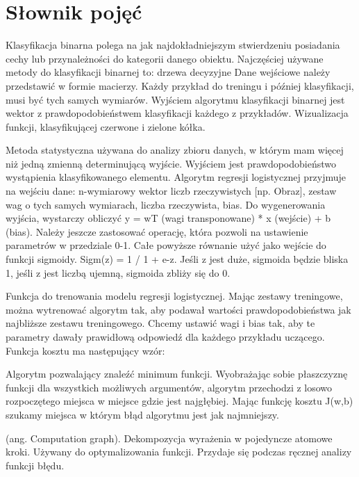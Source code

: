 \documentclass[a4paper,twoside,titlepage,openright]{book}
\begin{document}
\chapter*{Słownik pojęć}
\begin{description}[style=nextline]
	\item[Klasyfikacja binarna] Klasyfikacja binarna polega na jak najdokładniejszym stwierdzeniu posiadania cechy lub przynależności do kategorii danego obiektu.
Najczęściej używane metody do klasyfikacji binarnej to: drzewa decyzyjne 
Dane wejściowe należy przedstawić w formie macierzy. Każdy przykład do treningu i później klasyfikacji, musi być tych samych wymiarów. Wyjściem algorytmu klasyfikacji binarnej jest wektor z prawdopodobieństwem klasyfikacji każdego z przykładów. Wizualizacja funkcji, klasyfikującej czerwone i zielone kółka.
	\item[Regresja logistyczna] Metoda statystyczna używana do analizy zbioru danych, w którym mam więcej niż jedną zmienną determinującą wyjście. Wyjściem jest prawdopodobieństwo wystąpienia klasyfikowanego elementu. Algorytm regresji logistycznej przyjmuje na wejściu dane: n-wymiarowy wektor liczb rzeczywistych [np. Obraz], zestaw wag o tych samych wymiarach, liczba rzeczywista, bias.
Do wygenerowania wyjścia, wystarczy obliczyć y = wT (wagi transponowane) * x (wejście) + b (bias). Należy jeszcze zastosować operację, która pozwoli na ustawienie parametrów w przedziale 0-1. Całe powyższe równanie użyć jako wejście do funkcji sigmoidy. Sigm(z) = 1 / 1 + e-z. Jeśli z jest duże, sigmoida będzie bliska 1, jeśli z jest liczbą ujemną, sigmoida zbliży się do 0.
	\item[Funkcja kosztu] Funkcja do trenowania modelu regresji logistycznej. Mając zestawy treningowe, można wytrenować algorytm tak, aby podawał wartości prawdopodobieństwa jak najbliższe zestawu treningowego. Chcemy ustawić wagi i bias tak, aby te parametry dawały prawidłową odpowiedź dla każdego przykładu uczącego. Funkcja kosztu ma następujący wzór:
	\item[Metoda gradientu prostego] Algorytm pozwalający znaleźć minimum funkcji. Wyobrażając sobie płaszczyznę funkcji dla wszystkich możliwych argumentów, algorytm przechodzi z losowo rozpoczętego miejsca w miejsce gdzie jest najgłębiej. Mając funkcję kosztu J(w,b) szukamy miejsca w którym błąd algorytmu jest jak najmniejszy.
	\item[Wykres obliczeniowy] (ang. Computation graph). Dekompozycja wyrażenia w pojedyncze atomowe kroki. Używany do optymalizowania funkcji. Przydaje się podczas ręcznej analizy funkcji błędu.

\end{description}
\end{document}
